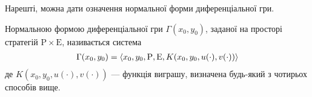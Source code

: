Нарешті, можна дати означення нормальної форми диференціальної гри.
\begin{definition}
    Нормальною формою диференціальної гри $\Gamma (x_0, y_0)$, заданої на просторі стратегій $\mathrm{P} \times \mathrm{E}$, називається система
    \begin{gather}
        \Gamma (x_0, y_0) = \left<x_0, y_0, \mathrm {P}, \mathrm{E}, K(x_0, y_0, u(\cdot), v(\cdot)) \right>
    \end{gather}
    де $K(x_0, y_0, u(\cdot), v(\cdot))$ --- функція виграшу, визначена будь-який з чотирьох способів вище.
\end{definition}